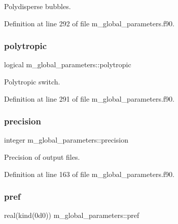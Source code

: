 Polydisperse bubbles. 



Definition at line 292 of file m\+\_\+global\+\_\+parameters.\+f90.

\mbox{\label{namespacem__global__parameters_a8d670f2f984167bae71b7b3f12d0908a}} 
\subsubsection{\texorpdfstring{polytropic}{polytropic}}
{\footnotesize\ttfamily logical m\+\_\+global\+\_\+parameters\+::polytropic}



Polytropic switch. 



Definition at line 291 of file m\+\_\+global\+\_\+parameters.\+f90.

\mbox{\label{namespacem__global__parameters_a6ed5e5561c16f30a4010f6612877029d}} 
\subsubsection{\texorpdfstring{precision}{precision}}
{\footnotesize\ttfamily integer m\+\_\+global\+\_\+parameters\+::precision}



Precision of output files. 



Definition at line 163 of file m\+\_\+global\+\_\+parameters.\+f90.

\mbox{\label{namespacem__global__parameters_aae2170af8a68c7dcdd91910aad867ef4}} 
\subsubsection{\texorpdfstring{pref}{pref}}
{\footnotesize\ttfamily real(kind(0d0)) m\+\_\+global\+\_\+parameters\+::pref}



